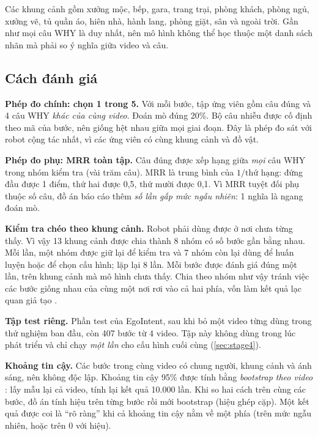 \documentclass[a4paper,oneside]{report}
\begin{document}
Các khung cảnh gồm xưởng mộc, bếp, gara, trang trại, phòng khách, phòng ngủ, xưởng vẽ, tủ quần áo, hiên nhà, hành lang, phòng giặt, sân và ngoài trời. Gần như mọi câu WHY là duy nhất, nên mô hình không thể học thuộc một danh sách nhãn mà phải so ý nghĩa giữa video và câu.

\subsection{Cách đánh giá}
\label{sec:eval}

\textbf{Phép đo chính: chọn 1 trong 5.} Với mỗi bước, tập ứng viên gồm câu đúng và 4 câu WHY \textit{khác của cùng video}. Đoán mò đúng 20\%. Bộ câu nhiễu được cố định theo mã của bước, nên giống hệt nhau giữa mọi giai đoạn. Đây là phép đo sát với robot cộng tác nhất, vì các ứng viên có cùng khung cảnh và đồ vật.

\textbf{Phép đo phụ: MRR toàn tập.} Câu đúng được xếp hạng giữa \textit{mọi} câu WHY trong nhóm kiểm tra (vài trăm câu). MRR \citep{voorhees1999trec} là trung bình của $1/\text{thứ hạng}$: đứng đầu được 1 điểm, thứ hai được 0,5, thứ mười được 0,1. Vì MRR tuyệt đối phụ thuộc số câu, đồ án báo cáo thêm \textit{số lần gấp mức ngẫu nhiên}: 1 nghĩa là ngang đoán mò.

\textbf{Kiểm tra chéo theo khung cảnh.} Robot phải dùng được ở nơi chưa từng thấy. Vì vậy 13 khung cảnh được chia thành 8 nhóm có số bước gần bằng nhau. Mỗi lần, một nhóm được giữ lại để kiểm tra và 7 nhóm còn lại dùng để huấn luyện hoặc để chọn cấu hình; lặp lại 8 lần. Mỗi bước được đánh giá đúng một lần, trên khung cảnh mà mô hình chưa thấy. Chia theo nhóm như vậy tránh việc các bước giống nhau của cùng một nơi rơi vào cả hai phía, vốn làm kết quả lạc quan giả tạo \citep{roberts2017cv}.

\textbf{Tập test riêng.} Phần test của EgoIntent, sau khi bỏ một video từng dùng trong thử nghiệm ban đầu, còn 407 bước từ 4 video. Tập này không dùng trong lúc phát triển và chỉ chạy \textit{một lần} cho cấu hình cuối cùng (\cref{sec:stage4}).

\textbf{Khoảng tin cậy.} Các bước trong cùng video có chung người, khung cảnh và ánh sáng, nên không độc lập. Khoảng tin cậy 95\% được tính bằng \textit{bootstrap theo video} \citep{efron1993bootstrap,field2007bootstrap}: lấy mẫu lại cả video, tính lại kết quả 10.000 lần. Khi so hai cách trên cùng các bước, đồ án tính hiệu trên từng bước rồi mới bootstrap (hiệu ghép cặp). Một kết quả được coi là ``rõ ràng'' khi cả khoảng tin cậy nằm về một phía (trên mức ngẫu nhiên, hoặc trên 0 với hiệu).
\end{document}

